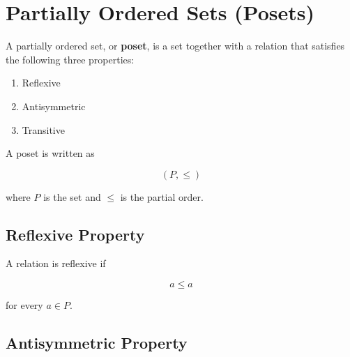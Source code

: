 \documentclass[12pt,a4paper]{article}
\begin{document}
\begin{center}
\end{center}


\section{Partially Ordered Sets (Posets)}

A partially ordered set, or \textbf{poset}, is a set together with a
relation that satisfies the following three properties:

\begin{enumerate}
    \item Reflexive
    \item Antisymmetric
    \item Transitive
\end{enumerate}

A poset is written as

\[
(P,\leq)
\]

where $P$ is the set and $\leq$ is the partial order.


\subsection{Reflexive Property}

A relation is reflexive if

\[
a\leq a
\]

for every $a\in P$.


\subsection{Antisymmetric Property}
\end{document}
